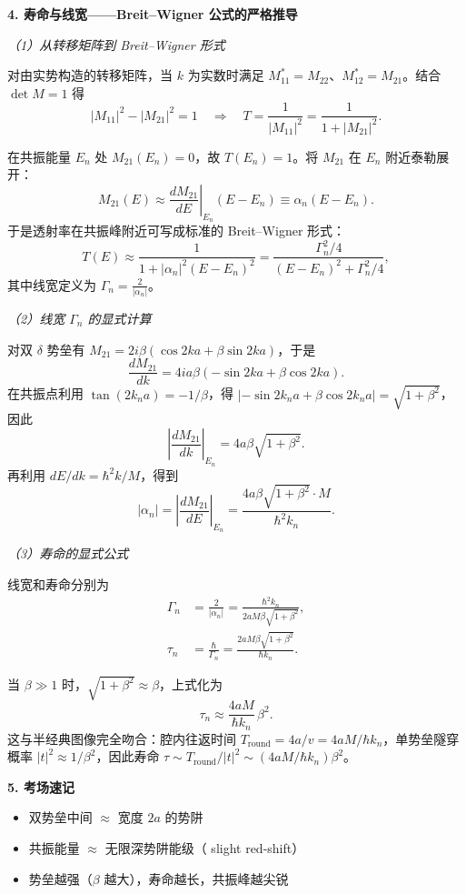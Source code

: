 \textbf{4. 寿命与线宽——Breit--Wigner 公式的严格推导}

\textit{（1）从转移矩阵到 Breit--Wigner 形式}

对由实势构造的转移矩阵，当 $k$ 为实数时满足 $M_{11}^*=M_{22}$、$M_{12}^*=M_{21}$。结合 $\det M=1$ 得
\[
|M_{11}|^2 - |M_{21}|^2 = 1 \quad\Longrightarrow\quad T = \frac{1}{|M_{11}|^2} = \frac{1}{1+|M_{21}|^2}.
\]

在共振能量 $E_n$ 处 $M_{21}(E_n)=0$，故 $T(E_n)=1$。将 $M_{21}$ 在 $E_n$ 附近泰勒展开：
\[
M_{21}(E) \approx \left.\frac{dM_{21}}{dE}\right|_{E_n} (E-E_n) \equiv \alpha_n (E-E_n).
\]
于是透射率在共振峰附近可写成标准的 Breit--Wigner 形式：
\[
T(E) \approx \frac{1}{1+|\alpha_n|^2(E-E_n)^2}
= \frac{\Gamma_n^2/4}{(E-E_n)^2 + \Gamma_n^2/4},
\]
其中线宽定义为 $\displaystyle \Gamma_n = \frac{2}{|\alpha_n|}$。

\textit{（2）线宽 $\Gamma_n$ 的显式计算}

对双 $\delta$ 势垒有 $M_{21}=2i\beta(\cos 2ka + \beta\sin 2ka)$，于是
\[
\frac{dM_{21}}{dk} = 4ia\beta(-\sin 2ka + \beta\cos 2ka).
\]
在共振点利用 $\tan(2k_n a)=-1/\beta$，得 $|-\sin 2k_n a + \beta\cos 2k_n a| = \sqrt{1+\beta^2}$，因此
\[
\left|\frac{dM_{21}}{dk}\right|_{E_n} = 4a\beta\sqrt{1+\beta^2}.
\]
再利用 $dE/dk = \hbar^2 k/M$，得到
\[
|\alpha_n| = \left|\frac{dM_{21}}{dE}\right|_{E_n}
= \frac{4a\beta\sqrt{1+\beta^2} \cdot M}{\hbar^2 k_n}.
\]

\textit{（3）寿命的显式公式}

线宽和寿命分别为
\begin{align*}
\Gamma_n &= \frac{2}{|\alpha_n|} = \frac{\hbar^2 k_n}{2aM\beta\sqrt{1+\beta^2}}, \\
\tau_n &= \frac{\hbar}{\Gamma_n} = \frac{2aM\beta\sqrt{1+\beta^2}}{\hbar k_n}.
\end{align*}

当 $\beta\gg 1$ 时，$\sqrt{1+\beta^2}\approx\beta$，上式化为
\[
\boxed{\tau_n \approx \frac{4aM}{\hbar k_n}\,\beta^2}.
\]
这与半经典图像完全吻合：腔内往返时间 $T_{\text{round}} = 4a/v = 4aM/\hbar k_n$，单势垒隧穿概率 $|t|^2 \approx 1/\beta^2$，因此寿命 $\tau \sim T_{\text{round}}/|t|^2 \sim (4aM/\hbar k_n)\beta^2$。


\textbf{5. 考场速记}
\begin{itemize}[nosep]
    \item 双势垒中间 $\approx$ 宽度 $2a$ 的势阱
    \item 共振能量 $\approx$ 无限深势阱能级（ slight red-shift）
    \item 势垒越强（$\beta$ 越大），寿命越长，共振峰越尖锐
\end{itemize}



